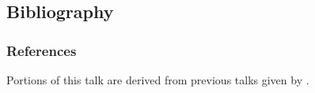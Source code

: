 \documentclass{beamer}
\begin{document}
\subsection{Bibliography}

\begin{frame}[allowframebreaks]
	\frametitle{References}
	Portions of this talk are derived from previous talks given by \cite{Ignjatovic2011,Liu2011}.

	
	
\end{frame}

\end{document}
